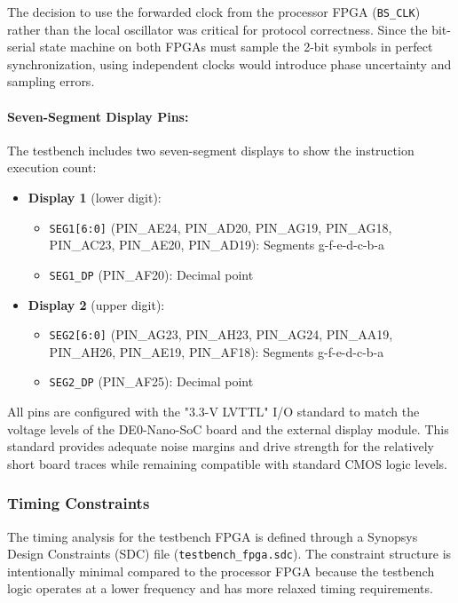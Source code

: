\documentclass[12pt]{article}
\begin{document}
The decision to use the forwarded clock from the processor FPGA (\texttt{BS\_CLK}) rather than the local oscillator was critical for protocol correctness. Since the bit-serial state machine on both FPGAs must sample the 2-bit symbols in perfect synchronization, using independent clocks would introduce phase uncertainty and sampling errors.

\paragraph{Seven-Segment Display Pins:}
The testbench includes two seven-segment displays to show the instruction execution count:

\begin{itemize}
    \item \textbf{Display 1} (lower digit):
    \begin{itemize}
        \item \texttt{SEG1[6:0]} (PIN\_AE24, PIN\_AD20, PIN\_AG19, PIN\_AG18, PIN\_AC23, PIN\_AE20, PIN\_AD19): Segments g-f-e-d-c-b-a
        \item \texttt{SEG1\_DP} (PIN\_AF20): Decimal point
    \end{itemize}
    
    \item \textbf{Display 2} (upper digit):
    \begin{itemize}
        \item \texttt{SEG2[6:0]} (PIN\_AG23, PIN\_AH23, PIN\_AG24, PIN\_AA19, PIN\_AH26, PIN\_AE19, PIN\_AF18): Segments g-f-e-d-c-b-a
        \item \texttt{SEG2\_DP} (PIN\_AF25): Decimal point
    \end{itemize}
\end{itemize}

All pins are configured with the "3.3-V LVTTL" I/O standard to match the voltage levels of the DE0-Nano-SoC board and the external display module. This standard provides adequate noise margins and drive strength for the relatively short board traces while remaining compatible with standard CMOS logic levels.

\subsubsection{Timing Constraints}

The timing analysis for the testbench FPGA is defined through a Synopsys Design Constraints (SDC) file (\texttt{testbench\_fpga.sdc}). The constraint structure is intentionally minimal compared to the processor FPGA because the testbench logic operates at a lower frequency and has more relaxed timing requirements.
\end{document}
